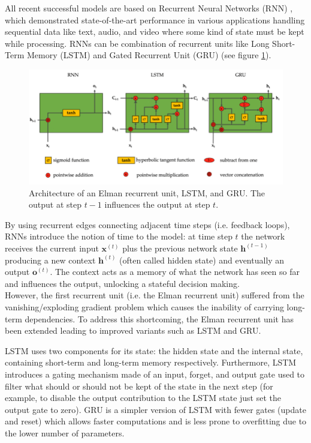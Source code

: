 \documentclass[a4paper, 12pt]{article} %
\begin{document}
	All recent successful models are based on Recurrent Neural Networks (RNN) \cite{RNN, RNNForecasting}, which demonstrated state-of-the-art performance in various applications handling sequential data like text, audio, and video where some kind of state must be kept while processing. RNNs can be combination of recurrent units like Long Short-Term Memory (LSTM) and Gated Recurrent Unit (GRU) (see figure \ref{fig:lstmgru}). 
	\begin{figure}
		\includegraphics[width=\linewidth]{img/rnns.png}
		\caption{Architecture of an Elman recurrent unit, LSTM, and GRU. The output at step $t-1$ influences the output at step $t$.}
		\label{fig:lstmgru}
	\end{figure}
	By using recurrent edges connecting adjacent time steps (i.e. feedback loops), RNNs introduce the notion of time to the model: at time step $t$ the network receives the current input $\pmb{x}^{(t)}$ plus the previous network state $\pmb{h}^{(t-1)}$ producing a new context $\pmb{h}^{(t)}$ (often called hidden state) and eventually an output $\pmb{o}^{(t)}$.
	The context acts as a memory of what the network has seen so far and influences the output, unlocking a stateful decision making.\\
	However, the first recurrent unit (i.e. the Elman recurrent unit) suffered from the vanishing/exploding gradient problem \cite{VanishingGradient} which causes the inability of carrying long-term dependencies. To address this shortcoming, the Elman recurrent unit has been extended leading to improved variants such as LSTM and GRU.
	
	LSTM uses two components for its state: the hidden state and the internal state, containing short-term and long-term memory respectively. Furthermore, LSTM introduces a gating mechanism made of an input, forget, and output gate used to filter what should or should not be kept of the state in the next step (for example, to disable the output contribution to the LSTM state just set the output gate to zero). GRU is a simpler version of LSTM with fewer gates (update and reset) which allows faster computations and is less prone to overfitting due to the lower number of parameters.
	
\end{document}
